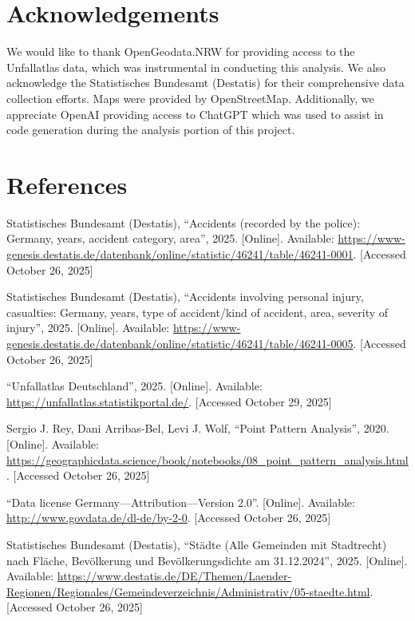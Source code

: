 \documentclass[10pt,a4paper]{article} %
\begin{document}
\section*{Acknowledgements}
We would like to thank OpenGeodata.NRW for providing access to the Unfallatlas data, which was instrumental in conducting this analysis. We also acknowledge the Statistisches Bundesamt (Destatis) for their comprehensive data collection efforts. Maps were provided by OpenStreetMap. Additionally, we appreciate OpenAI providing access to ChatGPT which was used to assist in code generation during the analysis portion of this project.

\newpage

\section*{References}
\begin{enumerate}[label={[\arabic*]}]
    \item Statistisches Bundesamt (Destatis), ``Accidents (recorded by the police): Germany, years, accident category, area'', 2025. [Online]. Available: \url{https://www-genesis.destatis.de/datenbank/online/statistic/46241/table/46241-0001}. [Accessed October 26, 2025] %
    \item Statistisches Bundesamt (Destatis), ``Accidents involving personal injury, casualties: Germany, years, type of accident/kind of accident, area, severity of injury'', 2025. [Online]. Available: \url{https://www-genesis.destatis.de/datenbank/online/statistic/46241/table/46241-0005}. [Accessed October 26, 2025] %
    \item ``Unfallatlas Deutschland'', 2025. [Online]. Available: \url{https://unfallatlas.statistikportal.de/}. [Accessed October 29, 2025] %
    \item Sergio J. Rey, Dani Arribas-Bel, Levi J. Wolf, ``Point Pattern Analysis'', 2020. [Online]. Available: \url{https://geographicdata.science/book/notebooks/08_point_pattern_analysis.html}. [Accessed October 26, 2025]
    \item ``Data license Germany---Attribution---Version 2.0''. [Online]. Available: \url{http://www.govdata.de/dl-de/by-2-0}. [Accessed October 26, 2025] %
    \item Statistisches Bundesamt (Destatis), ``Städte (Alle Gemeinden mit Stadtrecht) nach Fläche, Bevölkerung und Bevölkerungsdichte am 31.12.2024'', 2025. [Online]. Available: \url{https://www.destatis.de/DE/Themen/Laender-Regionen/Regionales/Gemeindeverzeichnis/Administrativ/05-staedte.html}. [Accessed October 26, 2025] %
\end{enumerate}
\end{document}
